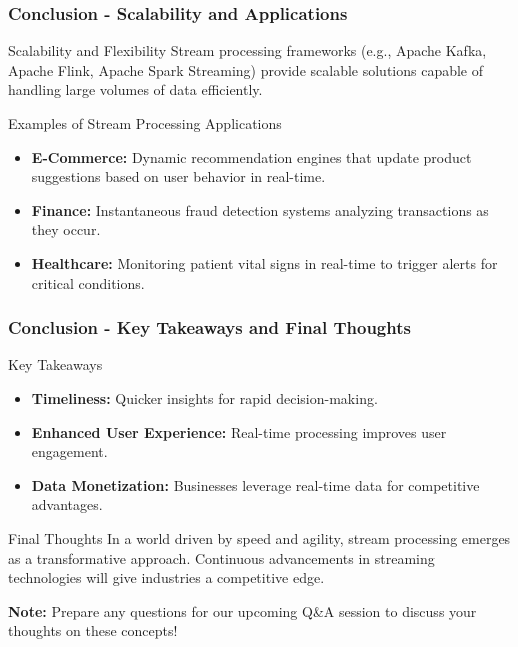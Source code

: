 \documentclass[aspectratio=169]{beamer}
\begin{document}
\begin{frame}[fragile]
    \frametitle{Conclusion - Scalability and Applications}
    
    \begin{block}{Scalability and Flexibility}
        Stream processing frameworks (e.g., Apache Kafka, Apache Flink, Apache Spark Streaming) provide scalable solutions capable of handling large volumes of data efficiently.
    \end{block}

    \begin{block}{Examples of Stream Processing Applications}
        \begin{itemize}
            \item \textbf{E-Commerce:} Dynamic recommendation engines that update product suggestions based on user behavior in real-time.
            \item \textbf{Finance:} Instantaneous fraud detection systems analyzing transactions as they occur.
            \item \textbf{Healthcare:} Monitoring patient vital signs in real-time to trigger alerts for critical conditions.
        \end{itemize}
    \end{block}
\end{frame}

\begin{frame}[fragile]
    \frametitle{Conclusion - Key Takeaways and Final Thoughts}
    
    \begin{block}{Key Takeaways}
        \begin{itemize}
            \item \textbf{Timeliness:} Quicker insights for rapid decision-making.
            \item \textbf{Enhanced User Experience:} Real-time processing improves user engagement.
            \item \textbf{Data Monetization:} Businesses leverage real-time data for competitive advantages.
        \end{itemize}
    \end{block}

    \begin{block}{Final Thoughts}
        In a world driven by speed and agility, stream processing emerges as a transformative approach. Continuous advancements in streaming technologies will give industries a competitive edge.
    \end{block}
    
    \textbf{Note:} Prepare any questions for our upcoming Q\&A session to discuss your thoughts on these concepts!
\end{frame}
\end{document}
